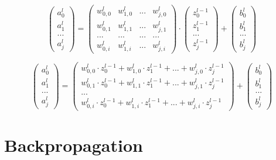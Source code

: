 \documentclass{article}
\begin{document}
\[ 
\left(\begin{array}{c} a_0^l \\ a_1^l \\ ... \\ a_j^l \end{array}\right)
=
\begin{pmatrix}
    w_{0,0}^l & w_{1,0}^l & ... & w_{j,0}^l \\
    w_{0,1}^l & w_{1,1}^l & ... & w_{j,1}^l \\
    ... & ... & ... & ... \\
    w_{0,i}^l & w_{1,i}^l & ... & w_{j,i}^l
\end{pmatrix}
\cdot
\left(\begin{array}{c} z_0^{l-1} \\ z_1^{l-1} \\ ... \\ z_j^{l-1} \end{array}\right)
+
\left(\begin{array}{c} b_0^l \\ b_1^l \\ ... \\ b_j^l \end{array}\right)
 \]

 \[
\left(\begin{array}{c} a_0^l \\ a_1^l \\ ... \\ a_j^l \end{array}\right)
=
\left(\begin{array}{c}
    w_{0,0}^l \cdot z_0^{l-1} + w_{1,0}^l \cdot z_1^{l-1} + ... + w_{j,0}^l \cdot z_j^{l-1} \\
    w_{0,1}^l \cdot z_0^{l-1} + w_{1,1}^l \cdot z_1^{l-1} + ... + w_{j,1}^l \cdot z_j^{l-1} \\
    ... \\
    w_{0,i}^l \cdot z_0^{l-1} + w_{1,i}^l \cdot z_1^{l-1} + ... + w_{j,i}^l \cdot z_j^{l-1}
\end{array}\right)
+
\left(\begin{array}{c} b_0^l \\ b_1^l \\ ... \\ b_j^l \end{array}\right)\]


\newpage
\section{Backpropagation}
\end{document}
